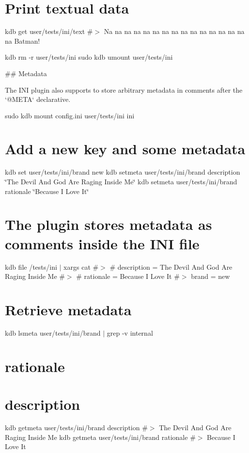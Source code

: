 \section*{Print textual data}

kdb get user/tests/ini/text \#$>$ Na na na na na na na na na na na na na na na na Batman!

kdb rm -\/r user/tests/ini sudo kdb umount user/tests/ini 
\begin{DoxyCode}
## Metadata

The INI plugin also supports to store arbitrary metadata in comments after the `@META` declarative.
\end{DoxyCode}
 sudo kdb mount config.\+ini user/tests/ini ini

\section*{Add a new key and some metadata}

kdb set user/tests/ini/brand new kdb setmeta user/tests/ini/brand description \char`\"{}\+The Devil And God Are Raging Inside Me\char`\"{} kdb setmeta user/tests/ini/brand rationale \char`\"{}\+Because I Love It\char`\"{}

\section*{The plugin stores metadata as comments inside the I\+NI file}

kdb file /tests/ini $\vert$ xargs cat \#$>$ \# description = The Devil And God Are Raging Inside Me \#$>$ \# rationale = Because I Love It \#$>$ brand = new

\section*{Retrieve metadata}

kdb lsmeta user/tests/ini/brand $\vert$ grep -\/v \textquotesingle{}internal\textquotesingle{} \section*{rationale}

\section*{description}

kdb getmeta user/tests/ini/brand description \#$>$ The Devil And God Are Raging Inside Me kdb getmeta user/tests/ini/brand rationale \#$>$ Because I Love It

